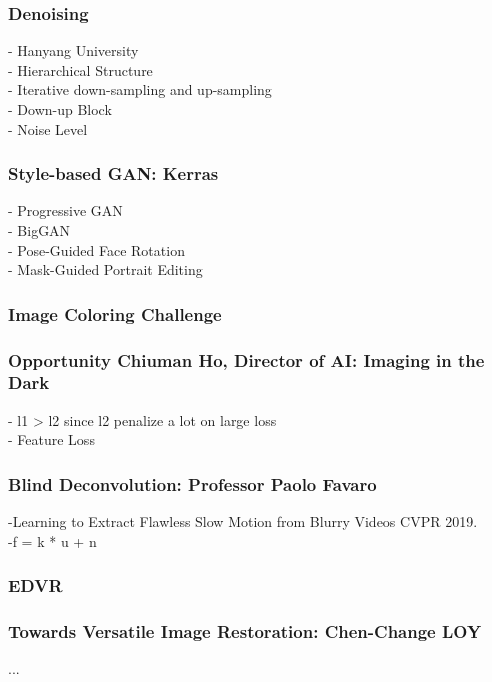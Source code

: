 \subsubsection{Denoising}
    - Hanyang University\\
    - Hierarchical Structure\\
    - Iterative down-sampling and up-sampling\\
    - Down-up Block\\
    - Noise Level\\
\subsubsection{Style-based GAN: Kerras}
    - Progressive GAN\\
    - BigGAN\\
    - Pose-Guided Face Rotation\\
    - Mask-Guided Portrait Editing\\

\subsubsection{Image Coloring Challenge}

\subsubsection{Opportunity Chiuman Ho, Director of AI: Imaging in the Dark}
    - l1 > l2 since l2 penalize a lot on large loss\\
    - Feature Loss\\

\subsubsection{Blind Deconvolution: Professor Paolo Favaro}
    -Learning to Extract Flawless Slow Motion from Blurry Videos CVPR 2019.\\
    -f = k * u + n\\
\subsubsection{EDVR}

\subsubsection{Towards Versatile Image Restoration: Chen-Change LOY}
...